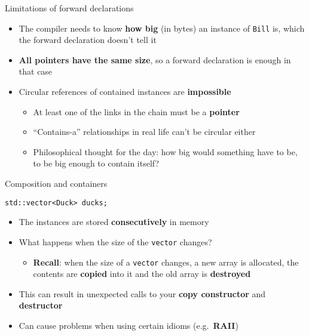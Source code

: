 \begin{frame}{Limitations of forward declarations}
    \begin{itemize}
        \item The compiler needs to know \textbf{how big} (in bytes) an instance of \lstinline{Bill} is,
            which the forward declaration doesn't tell it \pause
        \item \textbf{All pointers have the same size}, so a forward declaration is enough in that case \pause
        \item Circular references of contained instances are \textbf{impossible} \pause
            \begin{itemize}
                \item At least one of the links in the chain must be a \textbf{pointer} \pause
                \item ``Contains-a'' relationships in real life can't be circular either \pause
                \item Philosophical thought for the day: how big would something have to be,
                    to be big enough to contain itself?
            \end{itemize}
    \end{itemize}
\end{frame}

\begin{frame}[fragile]{Composition and containers}
    \begin{lstlisting}
std::vector<Duck> ducks;
    \end{lstlisting}
    \pause
    \begin{itemize}
        \item The instances are stored \textbf{consecutively} in memory \pause
        \item What happens when the size of the \lstinline{vector} changes? \pause
            \begin{itemize}
                \item \textbf{Recall}: when the size of a \lstinline{vector} changes,
                    a new array is allocated, the contents are \textbf{copied} into it
                    and the old array is \textbf{destroyed} \pause
            \end{itemize}
        \item This can result in unexpected calls to your \textbf{copy constructor}
            and \textbf{destructor} \pause
        \item Can cause problems when using certain idioms (e.g.\ \textbf{RAII})
    \end{itemize}
\end{frame}


